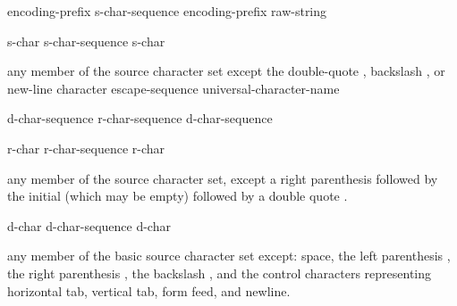 %
\begin{bnf}
\br
    encoding-prefix\opt{}  s-char-sequence\opt{} \br
    encoding-prefix\opt{}  raw-string
\end{bnf}

\begin{bnf}
\br
  \br
  \br
  \br
\end{bnf}

\begin{bnf}
\br
    s-char\br
    s-char-sequence s-char
\end{bnf}

\begin{bnftab}
\br
\>\textnormal{any member of the source character set except}\br
\>\>\textnormal{the double-quote , backslash \terminal{\textbackslash}, or new-line character}\br
\>escape-sequence\br
\>universal-character-name
\end{bnftab}

\begin{bnf}
\br
     d-char-sequence\opt{} \terminal{(} r-char-sequence\opt{} \terminal{)} d-char-sequence\opt{} 
\end{bnf}

\begin{bnf}
\br
    r-char\br
    r-char-sequence r-char
\end{bnf}

\begin{bnftab}
\br
\>\textnormal{any member of the source character set, except}\br
\>\>\textnormal{a right parenthesis \terminal{)} followed by the initial }\br
\>\>\textnormal{(which may be empty) followed by a double quote .}
\end{bnftab}

\begin{bnf}
\br
    d-char\br
    d-char-sequence d-char
\end{bnf}

\begin{bnftab}
\br
\>\textnormal{any member of the basic source character set except:}\br
\>\>\textnormal{space, the left parenthesis \terminal{(}, the right parenthesis \terminal{)}, the backslash \terminal{\textbackslash},}\br
\>\>\textnormal{and the control characters representing horizontal tab,}\br
\>\>\textnormal{vertical tab, form feed, and newline.}
\end{bnftab}

